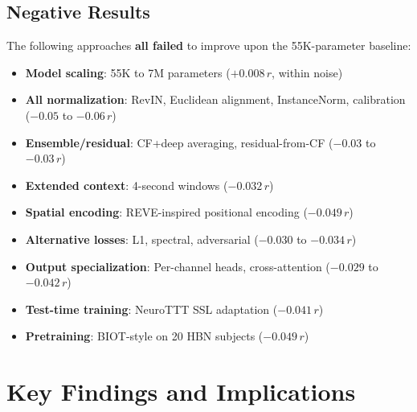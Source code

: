 \documentclass[11pt,a4paper]{article}
\begin{document}
\subsection{Negative Results}

The following approaches \textbf{all failed} to improve upon the
55K-parameter baseline:

\begin{itemize}
  \item \textbf{Model scaling}: 55K to 7M parameters ($+0.008\,r$, within noise)
  \item \textbf{All normalization}: RevIN, Euclidean alignment, InstanceNorm,
    calibration ($-0.05$ to $-0.06\,r$)
  \item \textbf{Ensemble/residual}: CF+deep averaging, residual-from-CF
    ($-0.03$ to $-0.03\,r$)
  \item \textbf{Extended context}: 4-second windows ($-0.032\,r$)
  \item \textbf{Spatial encoding}: REVE-inspired positional encoding ($-0.049\,r$)
  \item \textbf{Alternative losses}: L1, spectral, adversarial ($-0.030$ to $-0.034\,r$)
  \item \textbf{Output specialization}: Per-channel heads, cross-attention
    ($-0.029$ to $-0.042\,r$)
  \item \textbf{Test-time training}: NeuroTTT SSL adaptation ($-0.041\,r$)
  \item \textbf{Pretraining}: BIOT-style on 20 HBN subjects ($-0.049\,r$)
\end{itemize}

\section{Key Findings and Implications}
\end{document}
